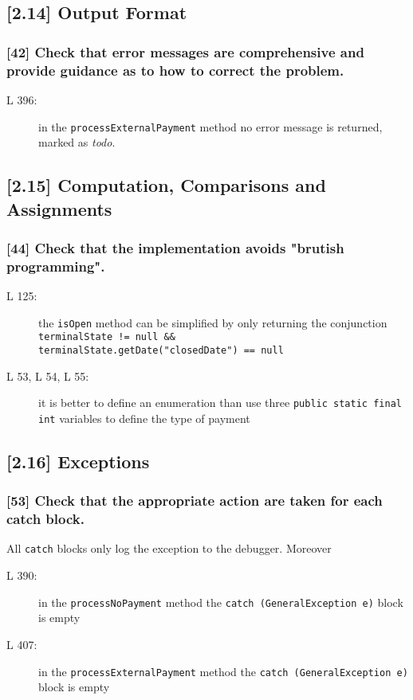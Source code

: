 \subsection*{[2.14] Output Format}
\subsubsection*{[42] Check that error messages are comprehensive and provide guidance as to how to correct the problem.}
\begin{description}
	\item[L 396:] in the {\tt processExternalPayment} method no error message is returned, marked as \emph{todo}.
\end{description}

\subsection*{[2.15] Computation, Comparisons and Assignments}
\subsubsection*{[44] Check that the implementation avoids "brutish programming".}
\begin{description}
	\item[L 125:] the {\tt isOpen} method can be simplified by only returning the conjunction {\tt terminalState != null \&\&\\ terminalState.getDate("closedDate") == null} 
	\item[L 53, L 54, L 55:] it is better to define an enumeration than use three {\tt public static final int} variables to define the type of payment
\end{description}

\subsection*{[2.16] Exceptions}
\subsubsection*{[53] Check that the appropriate action are taken for each catch block.}
All {\tt catch} blocks only log the exception to the debugger. Moreover
\begin{description}
	\item[L 390:] in the {\tt processNoPayment} method the {\tt catch (GeneralException e)} block is empty
	\item[L 407:] in the {\tt processExternalPayment} method the {\tt catch (GeneralException e)} block is empty
\end{description}